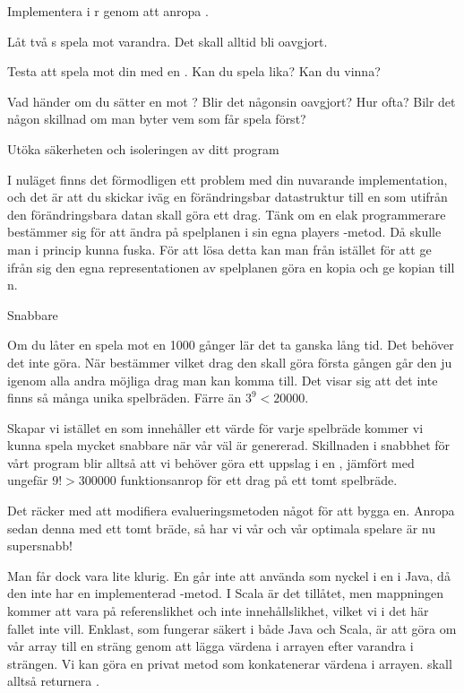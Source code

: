 \Subtask Implementera  i r genom att anropa .

\Subtask Låt två s spela mot varandra. Det skall alltid bli oavgjort.

\Subtask Testa att spela mot din  med en . Kan du spela lika? Kan du vinna?

\Subtask Vad händer om du sätter en  mot ? Blir det någonsin oavgjort? Hur ofta? Bilr det någon skillnad om man byter vem som får spela först?

\Task Utöka säkerheten och isoleringen av ditt program

I nuläget finns det förmodligen ett problem med din nuvarande implementation, och det är att du skickar iväg en förändringsbar datastruktur till en  som utifrån den förändringsbara datan skall göra ett drag. Tänk om en elak programmerare bestämmer sig för att ändra på spelplanen i sin egna players -metod. Då skulle man i princip kunna fuska. För att lösa detta kan man från  istället för att ge ifrån sig den egna representationen av spelplanen göra en kopia och ge kopian till n.

\Task Snabbare 

Om du låter en  spela mot en  1000 gånger lär det ta ganska lång tid. Det behöver det inte göra. När  bestämmer vilket drag den skall göra första gången går den ju igenom alla andra möjliga drag man kan komma till. Det visar sig att det inte finns så många unika spelbräden. Färre än $3^9 < 20000$. 

Skapar vi istället en  som innehåller ett värde för varje spelbräde kommer vi kunna spela mycket snabbare när vår  väl är genererad. Skillnaden i snabbhet för vårt program blir alltså att vi behöver göra ett uppslag i en , jämfört med ungefär $9! > 300000$ funktionsanrop för ett drag på ett tomt spelbräde. 

Det räcker med att modifiera evalueringsmetoden något för att bygga en. Anropa sedan denna med ett tomt bräde, så har vi vår  och vår optimala spelare är nu supersnabb!

Man får dock vara lite klurig. En  går inte att använda som nyckel i en  i Java, då den inte har en implementerad -metod. I Scala är det tillåtet, men mappningen kommer att vara på referenslikhet och inte innehållslikhet, vilket vi i det här fallet inte vill. Enklast, som fungerar säkert i både Java och Scala, är att göra om vår array till en sträng genom att lägga värdena i arrayen efter varandra i strängen. Vi kan göra en privat metod  som konkatenerar värdena i arrayen.  skall alltså returnera .

